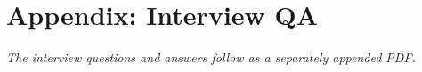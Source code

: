 \clearpage
\chapter*{Appendix: Interview QA}
{}
\noindent\textit{The interview questions and answers follow as a separately appended PDF.}
